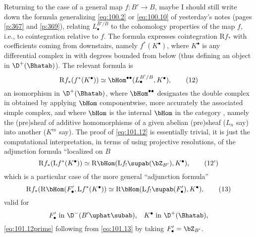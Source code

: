 Returning to the case of a general map $f:B'\to B$, maybe I should
still write down the formula generalizing \eqref{eq:100.2} or
\eqref{eq:100.10} of yesterday's notes (pages \ref{p:367} and
\ref{p:369}), relating $L_\bullet^{B'/B}$ to the cohomology properties
of the map $f$, i.e., to cointegration relative to $f$. The
formula expresses cointegration $\mathrm Rf_*$ with
coefficients coming from downstairs, namely $f^*(K^\bullet)$, where
$K^\bullet$ is any differential complex in \Bhatab{} with degrees
bounded from below (thus defining an object in $\D^+(\Bhatab)$). The
relevant formula is
\begin{equation}
  \label{eq:101.12}
  \mathrm Rf_*(f^*(K^\bullet)) \simeq \bHom^{\bullet\bullet}(L_\bullet^{B'/B},K^\bullet),\tag{12}
\end{equation}
an isomorphism in $\D^+(\Bhatab)$, where $\bHom^{\bullet\bullet}$
designates the double complex in \Bhatab{} obtained by applying
$\bHom$ componentwise, more accurately the associated simple complex,
and where $\bHom$ is the internal $\bHom$ in the category \Bhatab,
namely the (pre)sheaf of additive homomorphisms of a given abelian
(pre)sheaf ($L_n$ say) into another ($K^m$ say). The proof of
\eqref{eq:101.12} is essentially trivial, it is just the computational
interpretation, in terms of using projective resolutions, of the
adjunction formula ``localized on $B$
\begin{equation}
  \label{eq:101.12prime}
  \mathrm Rf_*(\mathrm Lf^*(K^\bullet)) \simeq \mathrm R\bHom(\mathrm
  Lf_!\supab(\bZ_{B'}), K^\bullet),\tag{12'}
\end{equation}
which is a particular case of the more general ``adjunction formula''
\begin{equation}
  \label{eq:101.13}
  \mathrm Rf_*(\mathrm R\bHom(F_\bullet', \mathrm Lf^*(K^\bullet))
  \simeq \mathrm R\bHom(\mathrm Lf_!\supab(F'_\bullet),K^\bullet),\tag{13}
\end{equation}
valid for
\[ \text{$F_\bullet'$ in $\D^-({B'}\uphat\subab)$,}\quad
\text{$K^\bullet$ in $\D^+(\Bhatab)$,}\]
\eqref{eq:101.12prime} following from \eqref{eq:101.13} by taking
$F_\bullet'=\bZ_{B'}$.

